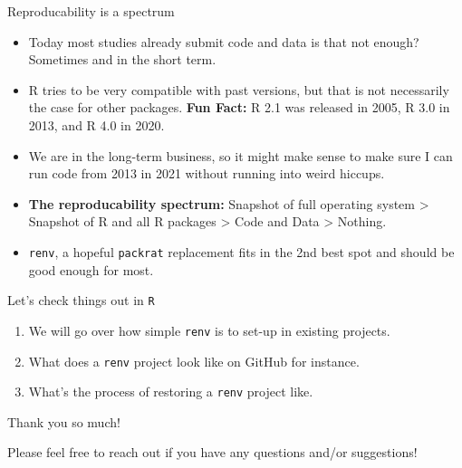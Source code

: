 \documentclass[aspectratio=169,xcolor=dvipsnames]{beamer}
\begin{document}
\begin{frame}[t]{Reproducability is a spectrum}
  \begin{itemize}
    \item Today most studies already submit code and data is that not enough? \pause Sometimes and in the short term. \pause
    \item R tries to be very compatible with past versions, but that is not necessarily the case for other packages. \textbf{Fun Fact:} R 2.1 was released in 2005, R 3.0 in 2013, and R 4.0 in 2020. \pause
    \item We are in the long-term business, so it might make sense to make sure I can run code from 2013 in 2021 \alert{without running into weird hiccups}.\pause
    \item \textbf{The reproducability spectrum:} Snapshot of full operating system \pause > Snapshot of R and all R packages \pause > Code and Data \pause > Nothing. \pause
    \item \texttt{renv}, a hopeful \texttt{packrat} replacement fits in the 2nd best spot and should be good enough for most.
  \end{itemize}
\end{frame}


\begin{frame}[t]{Let's check things out in \texttt{R}}
  \begin{enumerate}
    \item We will go over how simple \texttt{renv} is to set-up in existing projects.\pause\vspace{1em}
    \item What does a \texttt{renv} project look like on GitHub for instance.\pause\vspace{1em}
    \item What's the process of restoring a \texttt{renv} project like.
  \end{enumerate}
\end{frame}


\begin{frame}[t]{Thank you so much!}
  \vspace{3em}
  \begin{center}
    \begin{Large}
      Please feel free to reach out if you have any questions and/or suggestions!
    \end{Large}
  \end{center}
\end{frame}
\end{document}
